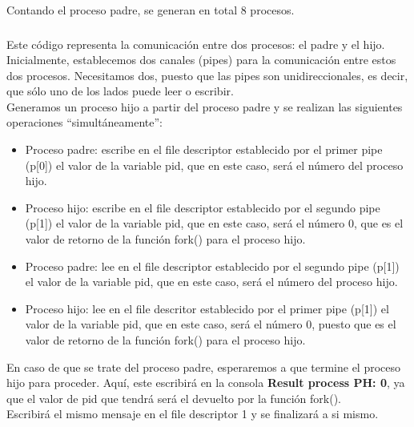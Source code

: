 \documentclass[spanish]{article}
\begin{document}
Contando el proceso padre, se generan en total 8 procesos.

\newpage

\subsubsection{}

Este código representa la comunicación entre dos procesos:
el padre y el hijo.\\

Inicialmente, establecemos dos canales (pipes) para la
comunicación entre estos dos procesos. Necesitamos dos,
puesto que las pipes son unidireccionales, es decir, que
sólo uno de los lados puede leer o escribir.\\

Generamos un proceso hijo a partir del proceso padre y se
realizan las siguientes operaciones ``simultáneamente'':

\begin{itemize}
\item Proceso padre: escribe en el file descriptor establecido por
el primer pipe (p[0]) el valor de la variable pid, que en
este caso, será el número del proceso hijo.

\item Proceso hijo: escribe en el file descriptor
establecido por el segundo pipe (p[1]) el valor de la
variable pid, que en este caso, será el número 0, que es el
valor de retorno de la función fork() para el proceso hijo.

\item Proceso padre: lee en el file descriptor establecido
por el segundo pipe (p[1]) el valor de la variable pid, que
en este caso, será el número del proceso hijo.

\item Proceso hijo: lee en el file descritor establecido por
el primer pipe (p[1]) el valor de la variable pid, que en
este caso, será el número 0, puesto que es el valor de
retorno de la función fork() para el proceso hijo.

\end{itemize}

En caso de que se trate del proceso padre, esperaremos a que
termine el proceso hijo para proceder. Aquí, este escribirá
en la consola \textbf{Result process PH: 0}, ya que el valor
de pid que tendrá será el devuelto por la función fork().\\

Escribirá el mismo mensaje en el file descriptor 1 y
se finalizará a si mismo.\\
\end{document}
